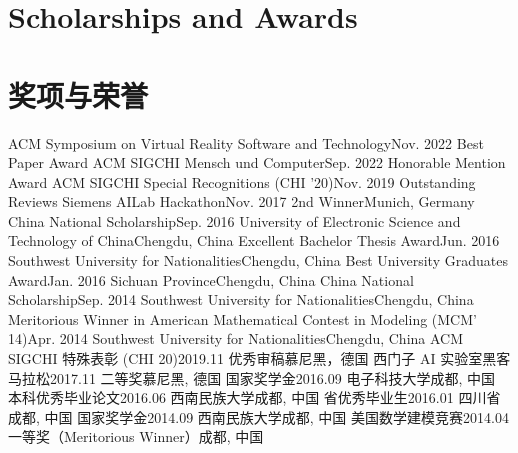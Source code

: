 
 {
\section{\textbf{Scholarships and Awards}}
}{
\section{\textbf{奖项与荣誉}}
}
\resumeSubHeadingListStartNoLabel
{} {
    \resumeSubheading
        {ACM Symposium on Virtual Reality Software and Technology}{Nov. 2022}
        {Best Paper Award}{}
    \resumeSubheading
        {ACM SIGCHI Mensch und Computer}{Sep. 2022}
        {Honorable Mention Award}{}
    \resumeSubheading
        {ACM SIGCHI Special Recognitions (CHI '20)}{Nov. 2019}
        {Outstanding Reviews}{}
    \resumeSubheading
        {Siemens AILab Hackathon}{Nov. 2017}
        {2nd Winner}{Munich, Germany}
    \resumeSubheading
        {China National Scholarship}{Sep. 2016}
        {University of Electronic Science and Technology of China}{Chengdu, China}
    \resumeSubheading
        {Excellent Bachelor Thesis Award}{Jun. 2016}
        {Southwest University for Nationalities}{Chengdu, China}
    \resumeSubheading
        {Best University Graduates Award}{Jan. 2016}
        {Sichuan Province}{Chengdu, China}
    \resumeSubheading
        {China National Scholarship}{Sep. 2014}
        {Southwest University for Nationalities}{Chengdu, China}
    \resumeSubheading
        {Meritorious Winner in American Mathematical Contest in Modeling (MCM' 14)}{Apr. 2014}
        {Southwest University for Nationalities}{Chengdu, China}
}{
    \resumeSubheading
        {ACM SIGCHI 特殊表彰 (CHI 20)}{2019.11}
        {优秀审稿}{慕尼黑，德国}
    \resumeSubheading
        {西门子 AI 实验室黑客马拉松}{2017.11}
        {二等奖}{慕尼黑, 德国}
    \resumeSubheading
        {国家奖学金}{2016.09}
        {电子科技大学}{成都, 中国}
    \resumeSubheading
        {本科优秀毕业论文}{2016.06}
        {西南民族大学}{成都, 中国}
    \resumeSubheading
        {省优秀毕业生}{2016.01}
        {四川省}{成都, 中国}
    \resumeSubheading
        {国家奖学金}{2014.09}
        {西南民族大学}{成都, 中国}
    \resumeSubheading
        {美国数学建模竞赛}{2014.04}
        {一等奖（Meritorious Winner）}{成都, 中国}
}
\resumeSubHeadingListEnd